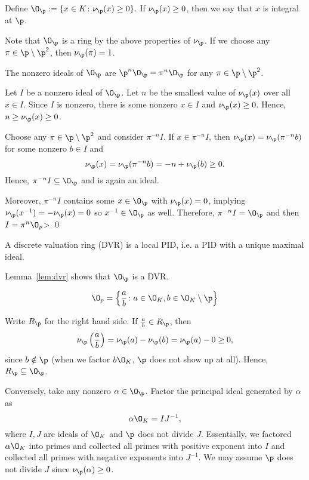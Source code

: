 \begin{dfn}[Integral at $\p$]
Define $\O_\p:=\{x \in K \colon \nu_\p(x) \geq 0\}$. If $\nu_\p(x) \geq 0$, then we say that $x$ is integral at $\p$. 
\end{dfn}

Note that $\O_\p$ is a ring by the above properties of $\nu_\p$. If we choose any $\pi \in \p \setminus \p^2$, then $\nu_\p(\pi)=1$.

\begin{lem}\label{lem:dvr}
The nonzero ideals of $\O_\p$ are $\p^n \O_\p=\pi^n \O_\p$ for any $\pi \in \p \setminus \p^2$.
\end{lem}

\pf Let $I$ be a nonzero ideal of $\O_\p$. Let $n$ be the smallest value of $\nu_\p(x)$ over all $x \in I$. Since $I$ is nonzero, there is some nonzero $x \in I$ and $\nu_\p(x) \geq 0$. Hence, $n \geq \nu_\p(x) \geq 0$. 

Choose any $\pi \in \p \setminus \p^2$ and consider $\pi^{-n}I$. If $x \in \pi^{-n}I$, then $\nu_\p(x)= \nu_\p(\pi^{-n}b)$ for some nonzero $b \in I$ and
	\[
	\nu_\p(x)= \nu_\p(\pi^{-n}b)= -n + \nu_\p(b) \geq 0.
	\]
Hence, $\pi^{-n}I \subseteq \O_\p$ and is again an ideal.

Moreover, $\pi^{-n}I$ contains some $x \in \O_\p$ with $\nu_\p(x)=0$, implying $\nu_\p(x^{-1})= -\nu_\p(x)=0$ so $x^{-1} \in \O_\p$ as well. Therefore, $\pi^{-n}I=\O_\p$ and then $I=\pi^n \O_p$> \qed \\

\begin{dfn}
A discrete valuation ring (DVR) is a local PID, i.e. a PID with a unique maximal ideal.
\end{dfn}

Lemma~\ref{lem:dvr} shows that $\O_\p$ is a DVR.

\begin{lem}
	\[
	\O_p= \left\{ \dfrac{a}{b} \colon a \in \O_K, b\in \O_K \setminus \p \right\}
	\]
\end{lem}

\pf Write $R_\p$ for the right hand side. If $\frac{a}{b} \in R_\p$, then
	\[
	\nu_\p\left(\frac{a}{b}\right)= \nu_\p(a) - \nu_\p(b)= \nu_\p(a) - 0 \geq 0,
	\]
since $b \notin \p$ (when we factor $b \O_K$, $\p$ does not show up at all). Hence, $R_\p \subseteq \O_\p$. 

Conversely, take any nonzero $\alpha \in \O_\p$. Factor the principal ideal generated by $\alpha$ as 
	\[
	\alpha \O_K= IJ^{-1},
	\]
where $I,J$ are ideals of $\O_K$ and $\p$ does not divide $J$. Essentially, we factored $\alpha \O_K$ into primes and collected all primes with positive exponent into $I$ and collected all primes with negative exponents into $J^{-1}$. We may assume $\p$ does not divide $J$ since $\nu_\p(\alpha) \geq 0$.

